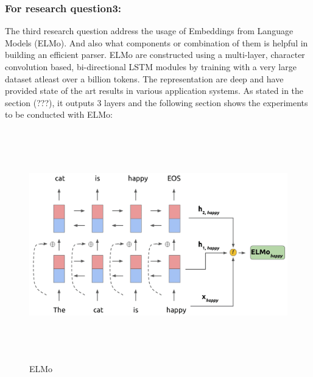 \documentclass[a4paper, 11pt]{article}
\begin{document}
\subsubsection{For research question3:}

The third research question address the usage of Embeddings from Language Models (ELMo). And also what components or combination of them is helpful in building an efficient parser. ELMo are constructed using a multi-layer, character convolution based, bi-directional LSTM modules by training with a very large dataset atleast over a billion tokens. The representation are deep and have provided state of the art results in various application systems. As stated in the section (???), it outputs 3 layers and the following section shows the experiments to be conducted with ELMo:

\begin{figure}[htpb]
    \centering
    \includegraphics[width=\textwidth,height=10cm,keepaspectratio=true]
    {elmo.png}
    \caption{
        ELMo
    }
    \label{fig:CKY}
\end{figure}
\end{document}
